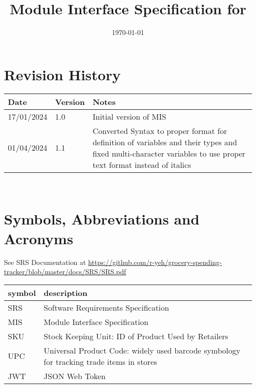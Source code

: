 \documentclass[12pt, titlepage]{article}
\begin{document}
\title{Module Interface Specification for \progname{}}

\author{\authname}

\date{\today}

\maketitle


\section{Revision History}

\begin{tabularx}{\textwidth}{p{3cm}p{2cm}X}
\toprule {\bf Date} & {\bf Version} & {\bf Notes}\\
\midrule
17/01/2024 & 1.0 & Initial version of MIS\\
01/04/2024 & 1.1 & Converted Syntax to proper format for definition of variables and their types and fixed multi-character variables to use proper text format instead of italics\\
\bottomrule
\end{tabularx}

~\newpage

\section{Symbols, Abbreviations and Acronyms}

See SRS Documentation at \url{https://github.com/r-yeh/grocery-spending-tracker/blob/master/docs/SRS/SRS.pdf}
\newline
\renewcommand{\arraystretch}{1.2}
\begin{tabular}{l l} 
  \toprule		
  \textbf{symbol} & \textbf{description}\\
  \midrule 
  SRS & Software Requirements Specification\\
  MIS & Module Interface Specification \\
  SKU & Stock Keeping Unit: ID of Product Used by Retailers \\
  UPC & Universal Product Code: widely used barcode symbology for tracking trade items in stores \\
  JWT & JSON Web Token \\
  \bottomrule
\end{tabular}\\
\end{document}
